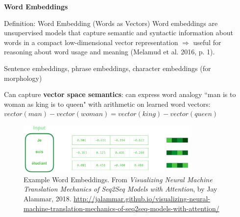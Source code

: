 
\begin{frame}{}
    \centering \large \textbf{Word Embeddings}
\end{frame}


\begin{frame}{}
    
    \begin{definitionBlock}{Definition: Word Embedding (Words as Vectors)}
        Word embeddings are unsupervised models that capture semantic and syntactic information about words in a compact low-dimensional vector representation $\Rightarrow$ useful for reasoning about word usage and meaning (Melamud et al. 2016, p. 1).
    \end{definitionBlock}
    \vspace{-5pt}
    
    
    \begin{itemizeSpaced}{3pt}
        
        
        \pinkbox Sentence embeddings, phrase embeddings, character embeddings (for morphology)
        
        \pinkbox Can capture \textbf{vector space semantics}: can express word analogy ``man is to woman as king is to queen" with arithmetic on learned word vectors: $vector(man) - vector(woman) = vector(king) - vector(queen)$
        
    \end{itemizeSpaced}
    
    \begin{figure}[h]
    \vspace{-10pt}
    \centering
    \includegraphics[width=0.8\textwidth]{imgs/example_word_embedding.png}
    \vspace{-5pt}
    \caption{\tiny \linespread{0.1} Example Word Embeddings. From \emph{Visualizing Neural Machine Translation Mechanics of Seq2Seq Models with Attention}, by Jay Alammar, 2018. \url{http://jalammar.github.io/visualizing-neural-machine-translation-mechanics-of-seq2seq-models-with-attention/}}
    \vspace{-10pt}
    \label{fig:exampleWordEmb}
    \end{figure}
    
\end{frame}



